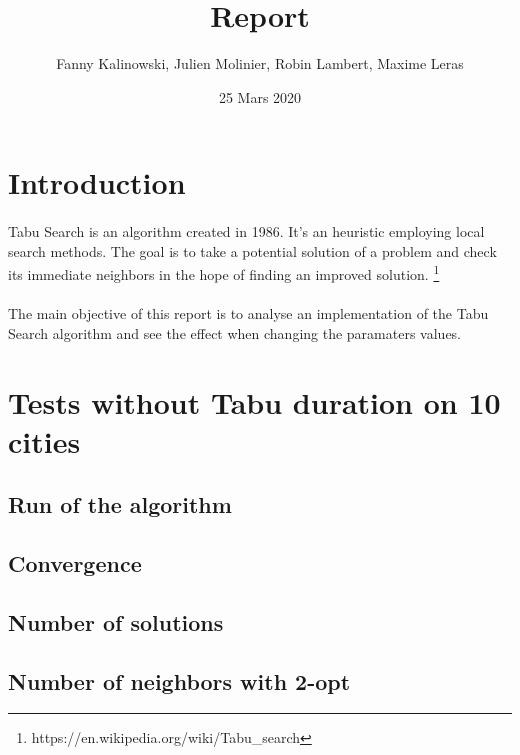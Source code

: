 \documentclass[12pt,oneside,a4paper]{article}
\begin{document}
\title{Report}
\author{Fanny Kalinowski, Julien Molinier, Robin Lambert, Maxime Leras}
\date{25 Mars 2020}
\maketitle
\newpage    
\tableofcontents

\newpage
{}
\section{Introduction}
\paragraph{}
    Tabu Search is an algorithm created in 1986. It's an heuristic employing
    local search methods. The goal is to take a potential solution of a problem
    and check its immediate neighbors in the hope of finding an improved solution.
    \footnote{https://en.wikipedia.org/wiki/Tabu\_search}
\paragraph{}
    The main objective of this report is to analyse an implementation of
    the Tabu Search algorithm and see the effect when changing the paramaters values.



    
\section{Tests without Tabu duration on 10 cities}
\subsection{Run of the algorithm}

\subsection{Convergence}

\subsection{Number of solutions}

\subsection{Number of neighbors with 2-opt}
\end{document}
